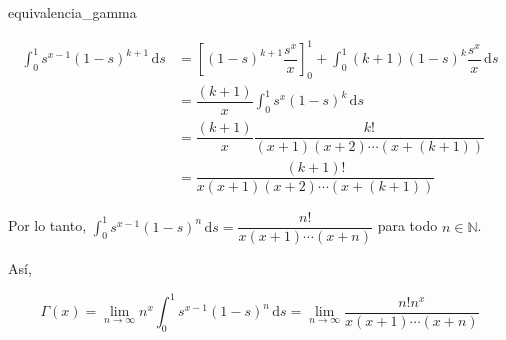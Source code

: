 \documentclass[fleqn]{article}
\newenvironment{lema}[2]{\begin{lem}[breakable, pad at break = 5mm, leftrule = 0.7mm, rightrule = 0.7mm, right = 2mm, left = 2mm, enlarge bottom finally by = 3mm, fontupper = \setlength{\parskip}{2mm}, fontlower = \setlength{\parskip}{2mm}]{#1}{#2}}{\end{lem}}
\newcommand{\nat}{\mathbb{N}}
\newcommand{\intg}[4]{\int_{#1}^{#2} \!\! #3 \, \mathrm{d} #4}
\begin{document}
\begin{lema}{}{equivalencia_gamma}
		\begin{minipage}{0.99\linewidth}
			\setlength{\parskip}{2mm}

			\begin{align*}
				\intg{0}{1}{s^{x-1} (1 - s)^{k+1}}{s} &= \left[ (1 - s)^{k+1} \dfrac{s^x}{x} \right]_0^1 + \intg{0}{1}{(k+1) (1-s)^k \dfrac{s^x}{x}}{s} \\
				&= \dfrac{(k+1)}{x} \intg{0}{1}{s^x (1-s)^k}{s} \\
				&= \dfrac{(k+1)}{x} \dfrac{k!}{(x + 1)(x + 2) \cdots (x + (k + 1))} \\
				&= \dfrac{(k+1)!}{x(x + 1)(x + 2) \cdots (x + (k + 1))}
			\end{align*}

			Por lo tanto, $ \displaystyle \intg{0}{1}{s^{x-1} (1 - s)^n}{s} = \dfrac{n!}{x(x + 1) \cdots (x + n)} $ para todo $ n \in \nat $.
		\end{minipage}

		Así, 

		\begin{equation*}
			\Gamma(x) = \lim_{n \to \infty} n^x \intg{0}{1}{s^{x-1} (1 - s)^n}{s} = \lim_{n \to \infty} \dfrac{n! n^x}{x(x + 1) \cdots (x + n)}
		\end{equation*}
	\end{lema}
\end{document}
